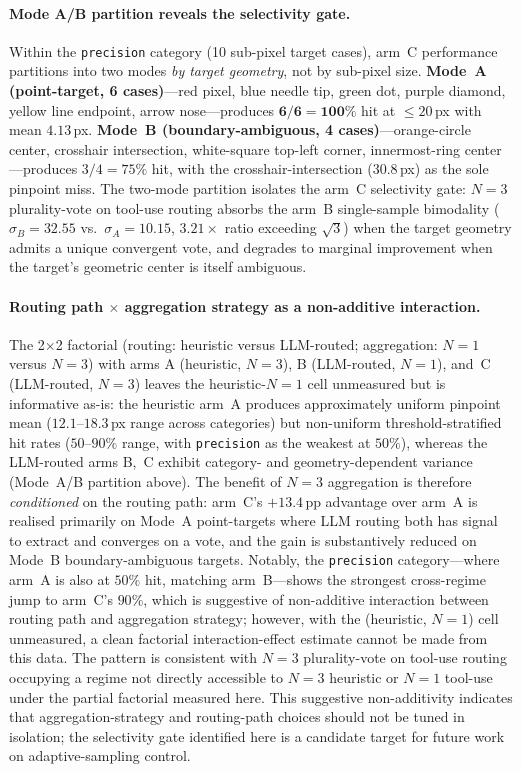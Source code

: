 \paragraph{Mode A/B partition reveals the selectivity gate.}
Within the \texttt{precision} category (10 sub-pixel target
cases), arm~C performance partitions into two modes
\emph{by target geometry}, not by sub-pixel size.
\textbf{Mode~A (point-target, 6 cases)}---red pixel, blue
needle tip, green dot, purple diamond, yellow line endpoint,
arrow nose---produces $\mathbf{6/6\!=\!100\%}$ hit at
$\leq\!20$\,px with mean $4.13$\,px.  \textbf{Mode~B
(boundary-ambiguous, 4 cases)}---orange-circle center,
crosshair intersection, white-square top-left corner,
innermost-ring center---produces $3/4\!=\!75\%$ hit, with the
crosshair-intersection ($30.8$\,px) as the sole pinpoint miss.
The two-mode partition isolates the arm~C selectivity gate:
$N\!=\!3$ plurality-vote on tool-use routing absorbs the
arm~B single-sample bimodality
($\sigma_B\!=\!32.55$ vs.\ $\sigma_A\!=\!10.15$, $3.21\!\times$
ratio exceeding $\sqrt{3}$) when the target geometry admits a
unique convergent vote, and degrades to marginal improvement
when the target's geometric center is itself ambiguous.

\paragraph{Routing path $\times$ aggregation strategy as a non-additive interaction.}
The 2$\times$2 factorial (routing: heuristic versus
LLM-routed; aggregation: $N\!=\!1$ versus $N\!=\!3$) with
arms A (heuristic, $N\!=\!3$), B (LLM-routed, $N\!=\!1$),
and~C (LLM-routed, $N\!=\!3$) leaves the heuristic-$N\!=\!1$
cell unmeasured but is informative as-is: the heuristic
arm~A produces approximately uniform pinpoint mean
($12.1$--$18.3$\,px range across categories) but non-uniform
threshold-stratified hit rates ($50$--$90\%$ range, with
\texttt{precision} as the weakest at $50\%$), whereas the
LLM-routed arms B,~C exhibit category- and
geometry-dependent variance (Mode~A/B partition above).  The benefit of
$N\!=\!3$ aggregation is therefore \emph{conditioned} on
the routing path: arm~C's $+13.4$\,pp advantage over arm~A
is realised primarily on Mode~A point-targets where
LLM routing both has signal to extract and converges on
a vote, and the gain is substantively reduced on Mode~B
boundary-ambiguous targets.  Notably, the \texttt{precision}
category---where arm~A is also at $50\%$ hit, matching
arm~B---shows the strongest cross-regime jump to arm~C's
$90\%$, which is suggestive of non-additive interaction
between routing path and aggregation strategy; however, with
the (heuristic, $N\!=\!1$) cell unmeasured, a clean factorial
interaction-effect estimate cannot be made from this data.
The pattern is consistent with $N\!=\!3$ plurality-vote on
tool-use routing occupying a regime not directly accessible
to $N\!=\!3$ heuristic or $N\!=\!1$ tool-use under the
partial factorial measured here.  This suggestive
non-additivity indicates that
aggregation-strategy and routing-path choices
should not be tuned in isolation; the selectivity gate
identified here is a candidate target for future
work on adaptive-sampling control.

